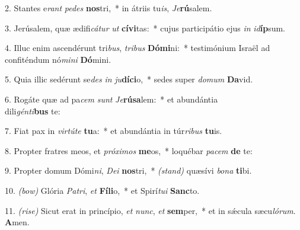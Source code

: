 2. Stantes e\textit{rant} \textit{pe}\textit{des} \textbf{nos}tri,~* 
	in átriis tu\textit{is}, \textit{Je}\textbf{rú}salem.

3. Jerúsalem, quæ ædifi\textit{cá}\textit{tur} \textit{ut} \textbf{cí}\textbf{vi}tas:~* 
	cujus participátio ejus \textit{in} \textit{id}\textbf{íp}sum.

4. Illuc enim ascendérunt tri\textit{bus}, \textit{tri}\textit{bus} \textbf{Dó}\textbf{mi}ni:~* 
	testimónium Israël ad confiténdum nó\textit{mi}\textit{ni} \textbf{Dó}mini.

5. Quia illic sedérunt se\textit{des} \textit{in} \textit{ju}\textbf{dí}\textbf{ci}o,~* 
	sedes super \textit{do}\textit{mum} \textbf{Da}vid.

6. Rogáte quæ ad pa\textit{cem} \textit{sunt} \textit{Je}\textbf{rú}\textbf{sa}lem:~* 
	et abundántia\\ dili\textit{gén}\textit{ti}\textbf{bus} te:

7. Fiat pax in \textit{vir}\textit{tú}\textit{te} \textbf{tu}a:~* 
	et abundántia in túr\textit{ri}\textit{bus} \textbf{tu}is.

8. Propter fratres meos, et \textit{pró}\textit{xi}\textit{mos} \textbf{me}os,~* 
	loquébar \textit{pa}\textit{cem} \textbf{de} te:

9. Propter domum Dómi\textit{ni}, \textit{De}\textit{i} \textbf{nos}tri,~* 
	{\color{red}\textit{(stand)}} quæsívi \textit{bo}\textit{na} \textbf{ti}bi.

10. {\color{red}\textit{(bow)}} Glória \textit{Pa}\textit{tri}, \textit{et} \textbf{Fí}\textbf{li}o,~* 
	et Spirí\textit{tu}\textit{i} \textbf{Sanc}to.

11. {\color{red}\textit{(rise)}} Sicut erat in princípio, \textit{et} \textit{nunc}, \textit{et} \textbf{sem}per,~* 
	et in s\'{\ae}cula sæcu\textit{ló}\textit{rum}. \textbf{A}men.